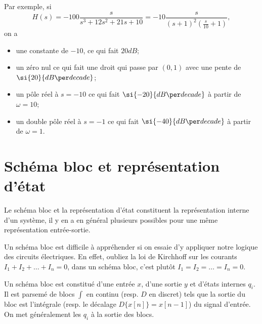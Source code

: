 \begin{myexem}
  \label{ex:bode}
  Par exemple, si
  \[ H(s) = -100\frac{s}{s^3+12s^2+21s+10} =
  -10\frac{s}{(s+1)^2\left(\frac{s}{10}+1\right)}, \]
  on a
  \begin{itemize}
    \item une constante de $-10$, ce qui fait
      $\si{20}{dB}$;
    \item un zéro nul ce qui fait une droit qui passe par $(0,1)$
      avec une pente de $\si{20}{dB\per decade}$;
    \item un pôle réel à $s = -10$ ce qui fait
      $\si{-20}{dB\per decade}$ à partir de $\omega = 10$;
    \item un double pôle réel à $s = -1$ ce qui fait
      $\si{-40}{dB\per decade}$ à partir de $\omega = 1$.
  \end{itemize}
\end{myexem}

\section{Schéma bloc et représentation d'état}
Le schéma bloc et la représentation d'état constituent la représentation
interne d'un système, il y en a en général plusieurs possibles pour une
même représentation entrée-sortie.

Un schéma bloc est difficile à appréhender si on essaie d'y appliquer
notre logique des circuits électriques.
En effet, oubliez la loi de Kirchhoff sur les courants
$I_1 + I_2 + \ldots + I_n = 0$, dans un schéma bloc, c'est plutôt
$I_1 = I_2 = \ldots = I_n = 0$.

Un schéma bloc est constitué d'une entrée $x$, d'une sortie $y$ et
d'états internes $q_i$.
Il est parsemé de blocs $\int$ en continu (resp. $D$ en discret) tels que
la sortie du bloc est l'intégrale (resp. le décalage $D\{x[n]\} = x[n-1]$) du
signal d'entrée.
On met généralement les $q_i$ à la sortie des blocs.

